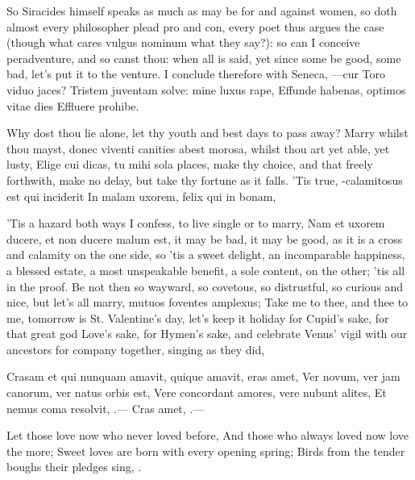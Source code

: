 {So Siracides himself speaks as much as may be for and against women, so
doth almost every philosopher plead pro and con, every poet thus argues
the case (though what cares vulgus nominum what they say?): so can I
conceive peradventure, and so canst thou: when all is said, yet since
some be good, some bad, let's put it to the venture. I conclude
therefore with Seneca,
---cur Toro viduo jaces?
Tristem juventam solve: mine luxus rape,
Effunde habenas, optimos vitae dies
Effluere prohibe.

Why dost thou lie alone, let thy youth and best days to pass away?
Marry whilst thou mayst, donec viventi canities abest morosa, whilst
thou art yet able, yet lusty, Elige cui dicas, tu mihi sola
places, make thy choice, and that freely forthwith, make no delay, but
take thy fortune as it falls. 'Tis true,
-calamitosus est qui inciderit
In malam uxorem, felix qui in bonam,

'Tis a hazard both ways I confess, to live single or to marry,
Nam et uxorem ducere, et non ducere malum est, it may be bad, it
may be good, as it is a cross and calamity on the one side, so 'tis a
sweet delight, an incomparable happiness, a blessed estate, a most
unspeakable benefit, a sole content, on the other; 'tis all in the
proof. Be not then so wayward, so covetous, so distrustful, so curious
and nice, but let's all marry, mutuos foventes amplexus; Take me to
thee, and thee to me, tomorrow is St. Valentine's day, let's keep it
holiday for Cupid's sake, for that great god Love's sake, for Hymen's
sake, and celebrate Venus' vigil with our ancestors for company
together, singing as they did,

Crasam et qui nunquam amavit, quique amavit, eras amet,
Ver novum, ver jam canorum, ver natus orbis est,
Vere concordant amores, vere nubunt alites,
Et nemus coma resolvit, \etc{}.---
Cras amet, \etc{}.---

Let those love now who never loved before,
And those who always loved now love the more;
Sweet loves are born with every opening spring;
Birds from the tender boughs their pledges sing, \etc{}.

}
